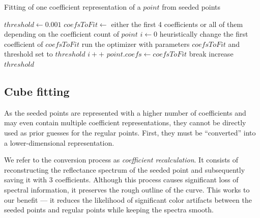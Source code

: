 \begin{algorithm}[t!]
	\caption{Fitting of one coefficient representation of a $point$ from seeded points}
	\label{alg:fittingAtlasLatticePoints}
	\begin{algorithmic}[1]
		\State $threshold \gets 0.001$
		\State $coefsToFit \gets$ either the first 4 coefficients or all of them depending on the coefficient count of $point$
		\State $i \gets 0$
		\State heuristically change the first coefficient of $coefsToFit$
		\State run the optimizer with parameters $coefsToFit$ and threshold set to $threshold$
		\State $i++$
		\EndWhile
		\State $point.coefs \gets coefsToFit$
		\State break
		\EndIf
		\State increase $threshold$
		\EndWhile
	\end{algorithmic}
\end{algorithm}

\subsection{Cube fitting} \label{ssec:cubeFitting}

As the seeded points are represented with a higher number of coefficients and may even contain multiple coefficient representations, they cannot be directly used as prior guesses for the regular points. First, they must be ``converted'' into a lower-dimensional representation.

We refer to the conversion process as \emph{coefficient recalculation}. It consists of reconstructing the reflectance spectrum of the seeded point and subsequently saving it with 3 coefficients. Although this process causes significant loss of spectral information, it preserves the rough outline of the curve. This works to our benefit --- it reduces the likelihood of significant color artifacts between the seeded points and regular points while keeping the spectra smooth.

